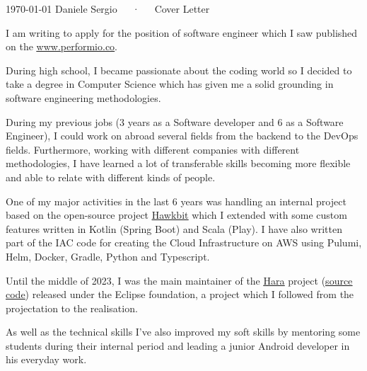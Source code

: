 \documentclass[11pt, a4paper]{awesome-cv}
\begin{document}
\makecvheader[R]

\makecvfooter
  {\today}
  {Daniele Sergio~~~·~~~Cover Letter}
  {}

\makelettertitle

\begin{cvletter}
I am writing to apply for the position of software engineer which I saw published on the \href{https://www.performio.co/careers?gh_jid=4378255006}{\underline{www.performio.co}}.

During high school, I became passionate about the coding world so I decided to take a degree in Computer Science which has given me a solid grounding in software engineering methodologies.

During my previous jobs (3 years as a Software developer and 6 as a Software Engineer), I could work on abroad several fields from the backend to the DevOps fields. Furthermore, working with different companies with different methodologies, I have learned a lot of transferable skills becoming more flexible and able to relate with different kinds of people.

One of my major activities in the last 6 years was handling an internal project based on the open-source project \href{https://eclipse.dev/hawkbit/}{\underline{Hawkbit}} which I extended with some custom features written in Kotlin (Spring Boot) and Scala (Play). I have also written part of the IAC code for creating the Cloud Infrastructure on AWS using Pulumi, Helm, Docker, Gradle, Python and Typescript.

Until the middle of 2023, I was the main maintainer of the \href{https://projects.eclipse.org/projects/iot.hawkbit.hara}{\underline{Hara}} project (\href{https://github.com/eclipse-hara/hara-ddiclient}{\underline{source code}}) released under the Eclipse foundation, a project which I followed from the projectation to the realisation.

As well as the technical skills I’ve also improved my soft skills by mentoring some students during their internal period and leading a junior Android developer in his everyday work.


\end{cvletter}
\end{document}
